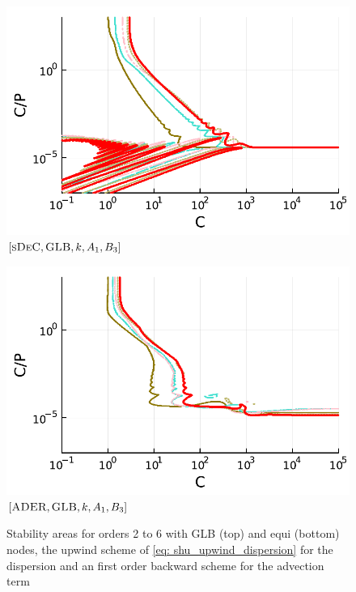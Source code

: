 \begin{figure}
\begin{minipage}[t]{0.32\textwidth}
		\includegraphics[width=\textwidth]{pdf/pdepics/disp/IMEXDeC_subtimesteps_gaussLobatto_disp_TMM_2-6_newE.pdf}
		\small$[\textsc{sDeC}, \textsc{GLB},k, A_1,B_3]$\par
	\end{minipage}
	\begin{minipage}[t]{0.32\textwidth}
		\centering
		\includegraphics[width=\textwidth]{pdf/pdepics/disp/IMEXADER_gaussLobatto_disp_TMM_2-6_newE.pdf}
		\small$[\textsc{ADER}, \textsc{GLB},k, A_1,B_3]$\par
	\end{minipage}
	\caption{Stability areas for orders 2 to 6 with GLB (top) and equi (bottom) nodes, the upwind scheme of \eqref{eq: shu_upwind_dispersion} for the dispersion and an first order backward scheme for the advection term}
	\label{fig: disp_allRK}
\end{figure}

